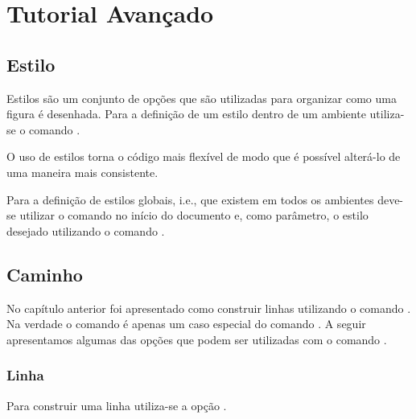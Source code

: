 % 
% 
% 
% 
% 
\chapter{Tutorial Avan\c{c}ado}
\section{Estilo}
Estilos s\~{a}o um conjunto de op\c{c}\~{o}es que s\~{a}o utilizadas para organizar como uma figura \'{e} desenhada. Para a defini\c{c}\~{a}o de um estilo dentro de um ambiente utiliza-se o comando .


O uso de estilos torna o c\'{o}digo mais flex\'{i}vel de modo que \'{e} poss\'{i}vel alter\'{a}-lo de uma maneira mais consistente.

Para a defini\c{c}\~{a}o de estilos globais, i.e., que existem em todos os ambientes deve-se utilizar o comando  no in\'{i}cio do documento e, como par\^{a}metro, o estilo desejado utilizando o comando .

\section{Caminho}
No cap\'{i}tulo anterior foi apresentado como construir linhas utilizando o comando . Na verdade o comando  \'{e} apenas um caso especial do comando . A seguir apresentamos algumas das op\c{c}\~{o}es que podem ser utilizadas com o comando .

\subsection{Linha}
Para construir uma linha utiliza-se a op\c{c}\~{a}o .

